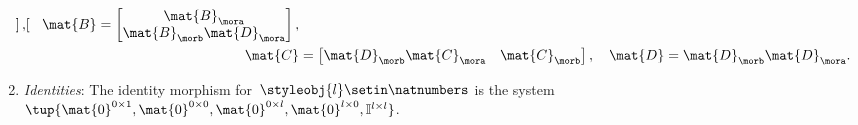 \begin{ctdefinition}
\begin{enumerate}
\begin{equation}
\begin{aligned}
\begin{bmatrix}
                              \end{bmatrix},\quad
                      \mat{B}=\begin{bmatrix}
                                  \mat{B}_\mora \\
                                  \mat{B}_\morb\mat{D}_\mora
                              \end{bmatrix}, \\
                      \mat{C}    & =\begin{bmatrix}
                                        \mat{D}_\morb\mat{C}_\mora & \mat{C}_\morb
                                    \end{bmatrix}, \quad
                      \mat{D}=\mat{D}_\morb\mat{D}_\mora.
                  \end{aligned}
              \end{equation}
        \item \emph{Identities}: The identity morphism for~$\styleobj{l}\setin \natnumbers$ is the system~$\tup{\mat{0}^{0\times 1},\mat{0}^{0\times 0},\mat{0}^{0\times l},\mat{0}^{l\times 0},\mathbb{I}^{l\times l}}$.

    \end{enumerate}
\end{ctdefinition}

